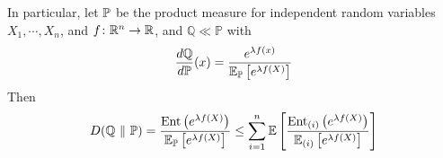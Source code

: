 \begin{enumerate}[label=\arabic{*}.]
\begin{rmk}
\begin{equation*}
	    \end{equation*}
	    In particular, let $\mathbb{P}$ be the product measure for independent random variables $X_1,\cdots,X_n$, and $f \colon \mathbb{R}^n \rightarrow \mathbb{R}$, and $\mathbb{Q} \ll \mathbb{P}$ with
	    \begin{equation*}
	    	\frac{d\mathbb{Q}}{d\mathbb{P}}(x) = \frac{e^{\lambda f(x)}}{\mathbb{E}_{\mathbb{P}}\left[e^{\lambda f(X)}\right]}
	    \end{equation*}
	    Then
	    \begin{equation*}
	        D(\mathbb{Q} ~\Vert~ \mathbb{P}) = \frac{\operatorname{Ent}\left(e^{\lambda f(X)}\right)}{\mathbb{E}_{\mathbb{P}}\left[e^{\lambda f(X)}\right]} \leq \sum_{i=1}^n\mathbb{E}\left[\frac{\operatorname{Ent}_{(i)}\left(e^{\lambda f(X)}\right)}{\mathbb{E}_{(i)}\left[e^{\lambda f(X)}\right]}\right]
	    \end{equation*}
	\end{rmk}
	
\end{enumerate}

